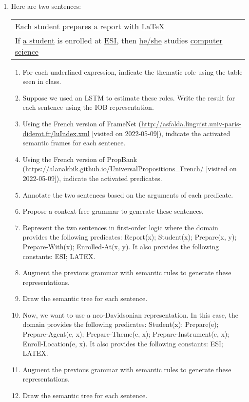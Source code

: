 \documentclass{KBook}
\begin{document}
\begin{enumerate}
	\item Here are two sentences:
	
	\begin{tabular}{|l|}
		\hline 
		\ul{Each student} prepares \ul{a report} with \ul{\LaTeX} \\
		If \ul{a student} is enrolled at \ul{ESI}, then \ul{he/she} studies \ul{computer science} \\
		\hline 
	\end{tabular}
	
	\begin{enumerate}
		\item For each underlined expression, indicate the thematic role using the table seen in class.
		\item Suppose we used an LSTM to estimate these roles. Write the result for each sentence using the IOB representation.
		\item Using the French version of FrameNet (\url{http://asfalda.linguist.univ-paris-diderot.fr/luIndex.xml} [visited on 2022-05-09]), indicate the activated semantic frames for each sentence.
		\item Using the French version of PropBank (\url{https://alanakbik.github.io/UniversalPropositions_French/} [visited on 2022-05-09]), indicate the activated predicates.
		\item Annotate the two sentences based on the arguments of each predicate.
		\item Propose a context-free grammar to generate these sentences.
		\item Represent the two sentences in first-order logic where the domain provides the following predicates: 
		Report(x); Student(x); Prepare(x, y); Prepare-With(x); Enrolled-At(x, y). 
		It also provides the following constants: ESI; LATEX.
		\item Augment the previous grammar with semantic rules to generate these representations.
		\item Draw the semantic tree for each sentence.
		\item Now, we want to use a neo-Davidsonian representation. 
		In this case, the domain provides the following predicates: 
		Student(x); Prepare(e); Prepare-Agent(e, x); Prepare-Theme(e, x); Prepare-Instrument(e, x); Enroll-Location(e, x).
		It also provides the following constants: ESI; LATEX.
		\item Augment the previous grammar with semantic rules to generate these representations.
		\item Draw the semantic tree for each sentence.
	\end{enumerate}
\end{enumerate}
\end{document}
